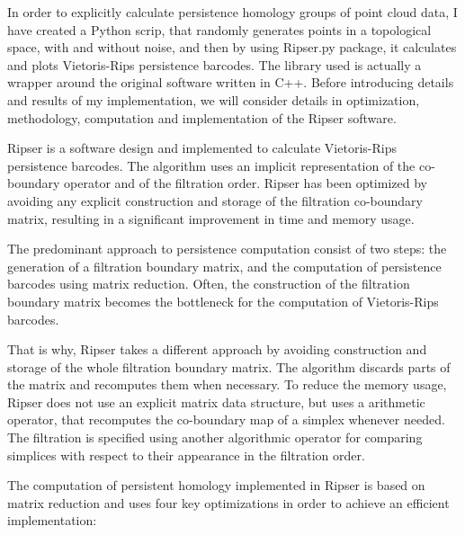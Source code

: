 \documentclass[11pt,a4paper]{report}
\begin{document}
            In order to explicitly calculate persistence homology groups of point cloud data, I have created a Python scrip, that randomly generates points in a topological space, with and without noise, and then by
            using Ripser.py package, it calculates and plots Vietoris-Rips persistence barcodes. The library used is actually a wrapper around the original software written in C++. Before introducing details and results of my implementation, we will consider details in optimization, methodology, computation and implementation of the Ripser software.

            Ripser is a software design and implemented to calculate Vietoris-Rips persistence barcodes. The algorithm uses
            an implicit representation of the co-boundary operator and of the filtration order. Ripser has been optimized by
            avoiding any explicit construction and storage of the filtration co-boundary matrix, resulting in a significant improvement in time and memory usage.

            The predominant approach to persistence computation consist of two steps: the generation of a filtration
            boundary matrix, and the computation of persistence barcodes using matrix reduction. Often, the construction of the filtration boundary matrix becomes
                the bottleneck for the computation of Vietoris-Rips barcodes.

            That is why, Ripser takes a different approach by avoiding construction and storage of the whole filtration boundary matrix. The algorithm discards parts of the matrix and recomputes them when necessary. To reduce the memory usage, Ripser does not use an explicit matrix data structure, but uses a arithmetic operator,
            that recomputes the co-boundary map of a simplex whenever needed. The filtration is specified using another algorithmic operator for
            comparing simplices with respect to their appearance in the filtration order.

            The computation of persistent homology implemented in Ripser is based on matrix reduction and uses four key
            optimizations in order to achieve an efficient implementation:
\end{document}
